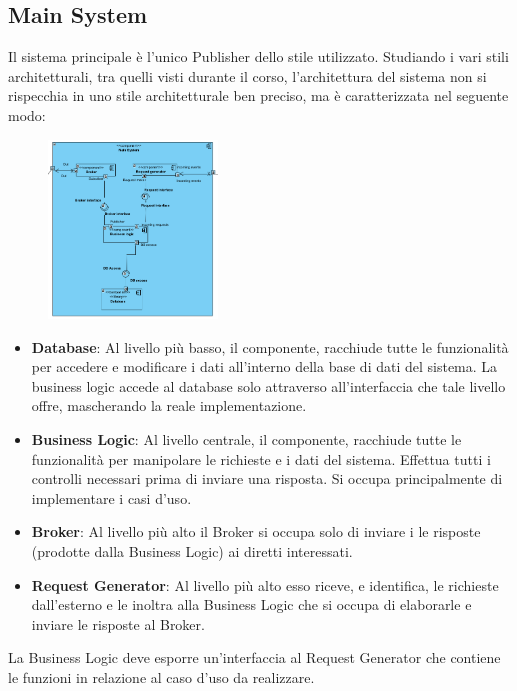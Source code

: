 \subsection{Main System}
Il sistema principale è l'unico Publisher dello stile utilizzato. Studiando i vari stili architetturali, tra quelli visti durante il corso, l'architettura del sistema non si rispecchia in uno stile architetturale ben preciso, ma è caratterizzata nel seguente modo:
\begin{figure}[H]
	\centering
	\includegraphics[width=0.4\textwidth]{Immagini/main_system.png}
\end{figure}
\begin{itemize}
	\item \textbf{Database}: Al livello più basso, il componente, racchiude tutte le funzionalità per accedere e modificare i dati all'interno della base di dati del sistema. La business logic accede al database solo attraverso all'interfaccia che tale livello offre, mascherando la reale implementazione.
	\item \textbf{Business Logic}: Al livello centrale, il componente, racchiude tutte le funzionalità per manipolare le richieste e i dati del sistema. Effettua tutti i controlli necessari prima di inviare una risposta. Si occupa principalmente di implementare i casi d'uso.
	\item \textbf{Broker}: Al livello più alto il Broker si occupa solo di inviare i le risposte (prodotte dalla Business Logic) ai diretti interessati. 
	\item \textbf{Request Generator}: Al livello più alto esso riceve, e identifica, le richieste dall'esterno e le inoltra alla Business Logic che si occupa di elaborarle e inviare le risposte al Broker.
\end{itemize}
La Business Logic deve esporre un'interfaccia al Request Generator che contiene le funzioni in relazione al caso d'uso da realizzare.

